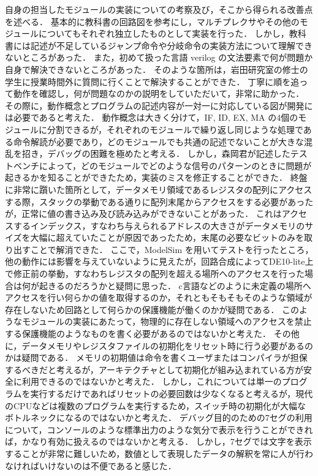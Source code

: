 \documentclass[dvipdfmx]{jsarticle}
\begin{document}
自身の担当したモジュールの実装についての考察及び，そこから得られる改善点を述べる．
基本的に教科書の回路図を参考にし，マルチプレクサやその他のモジュールについてもそれぞれ独立したものとして実装を行った．
しかし，教科書には記述が不足しているジャンプ命令や分岐命令の実装方法について理解できないところがあった．
また，初めて扱った言語 verilog の文法要素で何が問題か自身で解決できないところがあった．
そのような箇所は，岩田研究室の修士の学生に授業時間外に質問に行くことで解決することができた．
丁寧に順を追って動作を確認し，何が問題なのかの説明をしていただいて，非常に助かった．
その際に，動作概念とプログラムの記述内容が一対一に対応している図が開発には必要であると考えた．
動作概念は大きく分けて，IF, ID, EX, MA の4個のモジュールに分割できるが，それぞれのモジュールで繰り返し同じような処理である命令解読が必要であり，どのモジュールでも共通の記述でないことが大きな混乱を招き，デバッグの困難を極めたと考える．
しかし，森岡君が記述したテストベンチによって，どのモジュールでどのような信号のパターンのときに問題が起きるかを知ることができたため，実装のミスを修正することができた．
終盤に非常に躓いた箇所として，データメモリ領域であるレジスタの配列にアクセスする際，スタックの挙動である通りに配列末尾からアクセスをする必要があったが，正常に値の書き込み及び読み込みができないことがあった．
これはアクセスするインデックス，すなわち与えられるアドレスの大きさがデータメモリのサイズを大幅に超えていたことが原因であったため，末尾の必要なビットのみを取り出すことで解消できた．
ここで，ModelSim を用いてテストを行ったところ，他の動作には影響を与えていないように見えたが，回路合成によってDE10-lite上で修正前の挙動，すなわちレジスタの配列を超える場所へのアクセスを行った場合は何が起きるのだろうかと疑問に思った．
c言語などのように未定義の場所へアクセスを行い何らかの値を取得するのか，それともそもそもそのような領域が存在しないため回路として何らかの保護機能が働くのかが疑問である．
このようなモジュールの実装にあたって，物理的に存在しない領域へのアクセスを禁止する保護機能のようなものを書く必要があるのではないかと考えた．
その他に，データメモリやレジスタファイルの初期化をリセット時に行う必要があるのかは疑問である．
メモリの初期値は命令を書くユーザまたはコンパイラが担保するべきだと考えるが，アーキテクチャとして初期化が組み込まれている方が安全に利用できるのではないかと考えた．
しかし，これについては単一のプログラムを実行するだけであればリセットの必要回数は少なくなると考えるが，現代のCPUなどは複数のプログラムを実行するため，スイッチ時の初期化が大幅なボトルネックになるのではないかと考えた．
デバッグ目的のための7セグの利用について，コンソールのような標準出力のような気分で表示を行うことができれば，かなり有効に扱えるのではないかと考える．
しかし，7セグでは文字を表示することが非常に難しいため，数値として表現したデータの解釈を常に人が行わなければいけないのは不便であると感じた．
\end{document}
